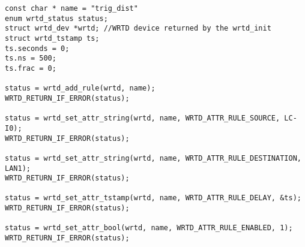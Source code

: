 \begin{lstlisting}[style=CStyle, 
                   caption = Example configuration of the rule for distributing the WRTD triggers., 
                   label=cap:trig_dist]
const char * name = "trig_dist"                                                
enum wrtd_status status;                                                       
struct wrtd_dev *wrtd; //WRTD device returned by the wrtd_init                 
struct wrtd_tstamp ts;                                                         
ts.seconds = 0;                                                                
ts.ns = 500;                                                                   
ts.frac = 0;                                                                   
                                                                               
status = wrtd_add_rule(wrtd, name);                                            
WRTD_RETURN_IF_ERROR(status);                                                  
                                                                               
status = wrtd_set_attr_string(wrtd, name, WRTD_ATTR_RULE_SOURCE, LC-I0);          
WRTD_RETURN_IF_ERROR(status);                                                  
                                                                               
status = wrtd_set_attr_string(wrtd, name, WRTD_ATTR_RULE_DESTINATION, LAN1);   
WRTD_RETURN_IF_ERROR(status);                                                  
                                                                               
status = wrtd_set_attr_tstamp(wrtd, name, WRTD_ATTR_RULE_DELAY, &ts);          
WRTD_RETURN_IF_ERROR(status);                                                  
                                                                               
status = wrtd_set_attr_bool(wrtd, name, WRTD_ATTR_RULE_ENABLED, 1);            
WRTD_RETURN_IF_ERROR(status);   
\end{lstlisting}


